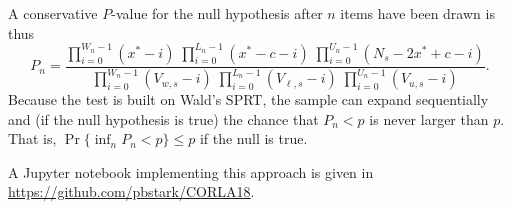 \documentclass[runningheads]{llncs}
\begin{document}

A conservative $P$-value for the null hypothesis after $n$ items have been drawn is thus
$$
   P_n =  \frac{\prod_{i=0}^{W_n-1} (x^*-i) \; \prod_{i=0}^{L_n-1}  (x^*-c-i) \; \prod_{i=0}^{U_n-1} (N_s-2x^*+c-i)}{\prod_{i=0}^{W_n-1}(V_{w,s}-i) \; \prod_{i=0}^{L_n-1} (V_{\ell,s}-i) \; \prod_{i=0}^{U_n-1} (V_{u,s}-i)}.
$$
Because the test is built on Wald's SPRT,  the sample can expand sequentially and 
(if the null hypothesis is true) the chance that $P_n < p$ is never larger than $p$.
That is, $\Pr \{ \inf_n P_n < p \} \le p$ if the null is true.

A Jupyter notebook implementing this approach is given in \url{https://github.com/pbstark/CORLA18}.



\end{document}
